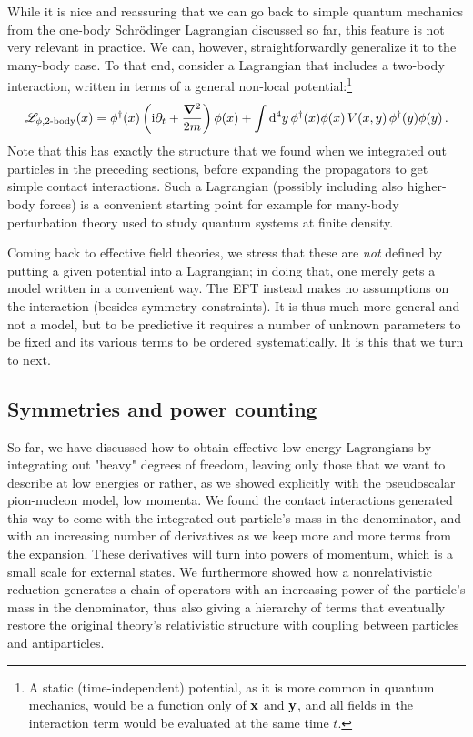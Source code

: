 While it is nice and reassuring that we can go back to simple quantum mechanics 
from the one-body Schr\"odinger Lagrangian discussed so far, this feature is 
not very relevant in practice.  We can, however, straightforwardly generalize 
it to the many-body case.  To that end, consider a Lagrangian that includes a 
two-body interaction, written in terms of a general non-local 
potential:\footnote{A static (time-independent) potential, as it is more common 
in quantum mechanics, would be a function only of $\mathbf{x}$ and $\mathbf{y}$, and all 
fields in the interaction term would be evaluated at the same time $t$.}
%
\begin{equation}
 \LL_{\phi,\text{2-body}}(x) = \phi^\dagger(x)
 \left(\ii\partial_t + \frac{\Laplace}{2m}\right)\phi(x)
 + \int\dd^4 y \, \phi^\dagger(x) \phi(x)
 \, V(x,y) \, \phi^\dagger(y) \phi(y) \,.
\label{eq:L-phi-V2-nonrel-hat}
\end{equation}
%
Note that this has exactly the structure that we found when we integrated out 
particles in the preceding sections, before expanding the propagators to get 
simple contact interactions.  Such a Lagrangian (possibly including also 
higher-body forces) is a convenient starting point for example for many-body 
perturbation theory used to study quantum systems at finite density.

Coming back to effective field theories, we stress that these are \emph{not} 
defined by putting a given potential into a Lagrangian; in doing that, 
one merely gets a model written in a convenient way.  The EFT instead makes no 
assumptions on the interaction (besides symmetry constraints).  It is thus much 
more general and not a model, but to be predictive it requires a number of 
\apriori unknown parameters to be fixed and its various terms to be ordered 
systematically.  It is this that we turn to next.

\subsection{Symmetries and power counting}

So far, we have discussed how to obtain effective low-energy Lagrangians by 
integrating out "heavy" degrees of freedom, leaving only those that we want  
to describe at low energies or rather, as we showed explicitly with the 
pseudoscalar pion-nucleon model, low momenta.  We found the contact 
interactions generated this way to come with the integrated-out particle's mass 
in the denominator, and with an increasing number of derivatives as we keep 
more and more terms from the expansion.  These derivatives will turn into 
powers of momentum, which is a small scale for external states.  We furthermore 
showed how a nonrelativistic reduction generates a chain of operators with an 
increasing power of the particle's mass in the denominator, thus also giving a 
hierarchy of terms that eventually restore the original theory's relativistic 
structure with coupling between particles and antiparticles.

